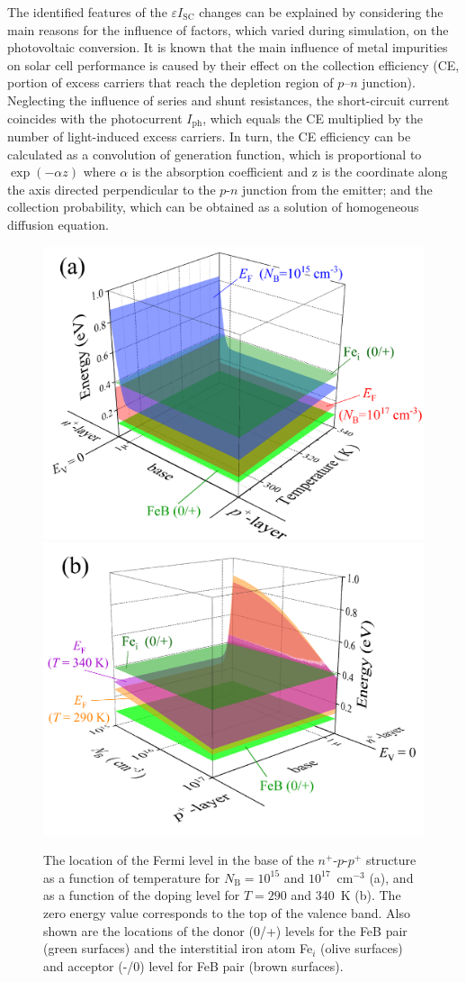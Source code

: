 \documentclass[a4paper,fleqn]{cas-sc}
\begin{document}
The identified features of the $\varepsilon I_\mathrm{SC}$ changes can be explained by considering 
the main reasons for the influence of factors, which varied during simulation, on the photovoltaic conversion.
It is known \cite{YangHandbookPVSi} that the main influence of metal impurities on solar cell performance is caused by their effect on the collection efficiency (CE, portion of excess carriers that reach the depletion region of $p$–$n$ junction). Neglecting the influence of series and shunt resistances, the short-circuit current coincides with the photocurrent $I_\mathrm{ph}$, which equals the CE multiplied by the number of light-induced excess carriers.  In turn, the CE efficiency can be calculated as a convolution of generation function, which is proportional to $\exp(-\alpha z)$ where $\alpha$ is the absorption coefficient and z is the coordinate along the axis directed perpendicular to the $p$-$n$ junction from the emitter; and the collection probability, which can be obtained as a solution of homogeneous diffusion equation.


\cite{YangHandbookPVSi,Goetzberger1998}

\begin{figure}
	\centering
     \includegraphics[width=0.49\linewidth]{Fig4a.png}
     \includegraphics[width=0.49\linewidth]{Fig4b.png}
	  \caption{The location of the Fermi level in the base of the $n^+$-$p$-$p^+$ structure
       as a function of temperature for $N_\mathrm{B}=10^{15}$ and $10^{17}$~cm$^{-3}$ (a),
       and as a function of the doping level for $T=290$ and 340~K (b).
       The zero energy value corresponds to the top of the valence band.
       Also shown are the locations of the donor (0/+) levels for the FeB pair (green surfaces)
       and the interstitial iron atom Fe$_i$ (olive surfaces) and acceptor (-/0) level for FeB pair (brown surfaces).
}\label{fig4}
\end{figure}
\end{document}
